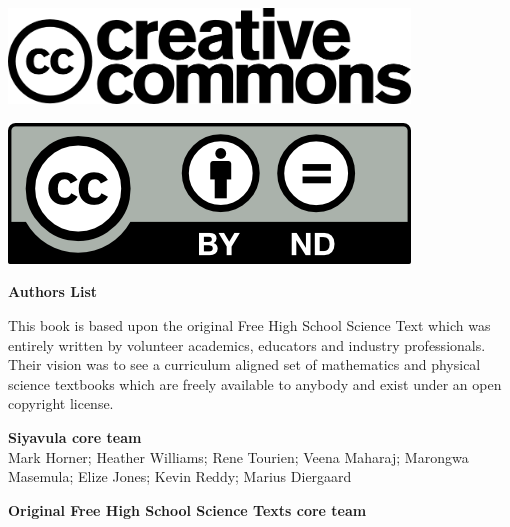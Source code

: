 \vspace*{4in}

\begin{center}
\begin{minipage}{0.6\textwidth}
\includegraphics[width=0.8\textwidth]{title_images/cc2.png}
\end{minipage}
\begin{minipage}{0.3\textwidth}
\includegraphics[width=0.8\textwidth]{title_images/cc1.png}
\end{minipage}
\end{center}







\newpage
\thispagestyle{empty}


\begin{flushleft} \textbf{\huge Authors List} \end{flushleft}

{\LARGE This book is based upon the original Free High School Science Text which was entirely written by
volunteer academics, educators and industry professionals. Their vision was to see a curriculum aligned
set of mathematics and physical science textbooks which are freely available to anybody and exist
under an open copyright license.} \par

\textbf{\LARGE Siyavula core team} \\

Mark Horner; Heather Williams; Rene Tourien; Veena Maharaj; Marongwa Masemula; Elize Jones; Kevin Reddy; Marius Diergaard \par

\textbf{\LARGE Original Free High School Science Texts core team}\\

